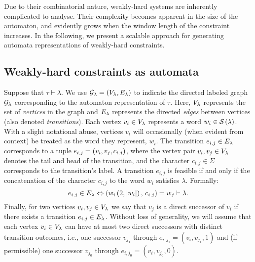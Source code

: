 Due to their combinatorial nature, weakly-hard systems are inherently complicated to analyse.
Their complexity becomes apparent in the size of the automaton, and evidently grows when the window length of the constraint increases.
In the following, we present a scalable approach for generating automata representations of weakly-hard constraints.

\subsection{Weakly-hard constraints as automata}%
\label{sec:tool:notation}%
%
Suppose that $\tau \vdash \lambda$.
We use $\mathcal{G}_{\lambda} = (V_{\lambda}, E_{\lambda})$ to indicate the directed labeled graph $\mathcal{G}_{\lambda}$ corresponding to the automaton representation of $\tau$.
Here, $V_{\lambda}$ represents the set of \emph{vertices} in the graph and $E_{\lambda}$ represents the directed \emph{edges} between vertices (also denoted \emph{transitions}).
Each vertex $v_i \in V_{\lambda}$ represents a word $w_i \in \mathcal{S}_{}\left( \lambda \right)$.
With a slight notational abuse, vertices $v_i$ will occasionally (when evident from context) be treated as the word they represent, $w_i$.
The transition $e_{i,j} \in E_{\lambda}$ corresponds to a tuple $e_{i,j} = \left( v_i, v_j, c_{i, j} \right)$, where the vertex pair $v_i, v_j \in V_{\lambda}$ denotes the tail and head of the transition, and the character $c_{i,j} \in \Sigma$ corresponds to the transition's label.
A transition $e_{i, j}$ is feasible if and only if the concatenation of the character $c_{i,j}$ to the word $w_i$ satisfies $\lambda$. Formally: 
\begin{equation*}
    e_{i, j} \in E_{\lambda} \Leftrightarrow \left( w_i\left( 2,\left|w_i\right| \right),\, c_{i,j} \right) = w_j \vdash \lambda.
\end{equation*}
Finally, for two vertices $v_i, v_j \in V_{\lambda}$ we say that $v_j$ is a direct successor of $v_i$ if there exists a transition $e_{i,j} \in E_{\lambda}$.
Without loss of generality, we will assume that each vertex $v_i \in V_{\lambda}$ can have at most two direct successors with distinct transition outcomes, i.e., one successor $v_{j_1}$ through $e_{i, j_1} = \left( v_i, v_{j_1}, 1 \right)$ and (if permissible) one successor $v_{j_0}$ through $e_{i, j_0} = \left( v_i, v_{j_0}, 0 \right)$.

